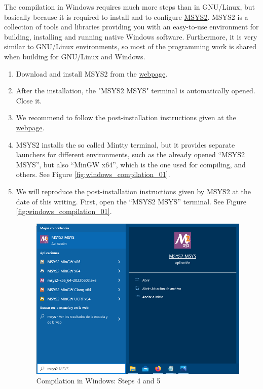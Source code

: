 \documentclass[a4paper,fleqn]{book}
\begin{document}
The compilation in Windows requires much more steps than in GNU/Linux, but basically because it is required to install and to configure \href{https://www.msys2.org/}{MSYS2}. MSYS2 is a collection of tools and libraries providing you with an easy-to-use environment for building, installing and running native Windows software. Furthermore, it is very similar to GNU/Linux environments, so most of the programming work is shared when building for GNU/Linux and Windows.
\begin{enumerate}
  \item Download and install MSYS2 from the \href{https://www.msys2.org/}{webpage}. 
  \item After the installation, the "MSYS2 MSYS" terminal is automatically opened. Close it. 
  \item We recommend to follow the post-installation instructions given at the \href{https://www.msys2.org/}{webpage}. 
  \item MSYS2 installs the so called Mintty terminal, but it provides separate launchers for different environments, such as the already opened ``MSYS2 MSYS'', but also ``MinGW x64'', which is the one used for compiling, and others. See Figure \ref{fig:windows_compilation_01}.
  \item We will reproduce the post-installation instructions given by \href{https://www.msys2.org/}{MSYS2} at the date of this writing. First, open the ``MSYS2 MSYS'' terminal. See Figure \ref{fig:windows_compilation_01}.
  \begin{figure}[h]
  \centering
  \includegraphics[scale=0.5]{figures/windows_compilation_01.png}
  \caption{Compilation in Windows: Steps 4 and 5}

\end{figure}
\end{enumerate}
\end{document}
